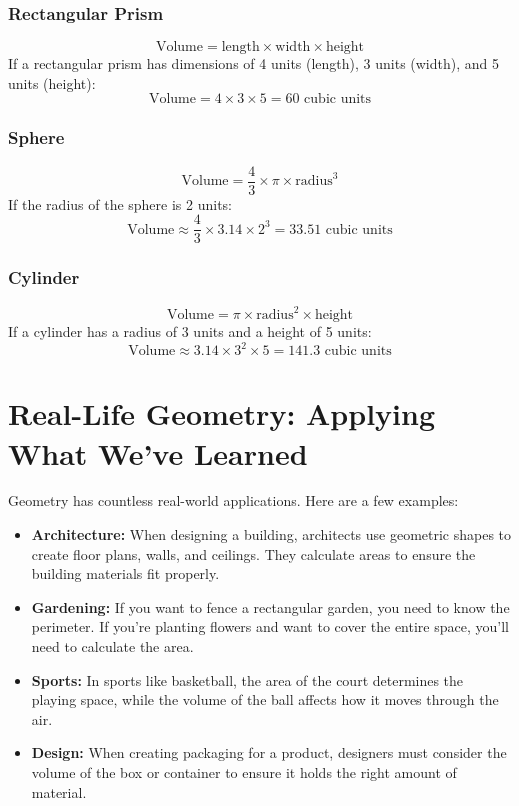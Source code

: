 \subsubsection{Rectangular Prism}
\[
\text{Volume} = \text{length} \times \text{width} \times \text{height}
\]
If a rectangular prism has dimensions of 4 units (length), 3 units (width), and 5 units (height):
\[
\text{Volume} = 4 \times 3 \times 5 = 60 \text{ cubic units}
\]

\subsubsection{Sphere}
\[
\text{Volume} = \frac{4}{3} \times \pi \times \text{radius}^3
\]
If the radius of the sphere is 2 units:
\[
\text{Volume} \approx \frac{4}{3} \times 3.14 \times 2^3 = 33.51 \text{ cubic units}
\]

\subsubsection{Cylinder}
\[
\text{Volume} = \pi \times \text{radius}^2 \times \text{height}
\]
If a cylinder has a radius of 3 units and a height of 5 units:
\[
\text{Volume} \approx 3.14 \times 3^2 \times 5 = 141.3 \text{ cubic units}
\]

\section{Real-Life Geometry: Applying What We’ve Learned}
Geometry has countless real-world applications. Here are a few examples:

\begin{itemize}
    \item \textbf{Architecture:} When designing a building, architects use geometric shapes to create floor plans, walls, and ceilings. They calculate areas to ensure the building materials fit properly.
    \item \textbf{Gardening:} If you want to fence a rectangular garden, you need to know the perimeter. If you’re planting flowers and want to cover the entire space, you’ll need to calculate the area.
    \item \textbf{Sports:} In sports like basketball, the area of the court determines the playing space, while the volume of the ball affects how it moves through the air.
    \item \textbf{Design:} When creating packaging for a product, designers must consider the volume of the box or container to ensure it holds the right amount of material.
\end{itemize}

